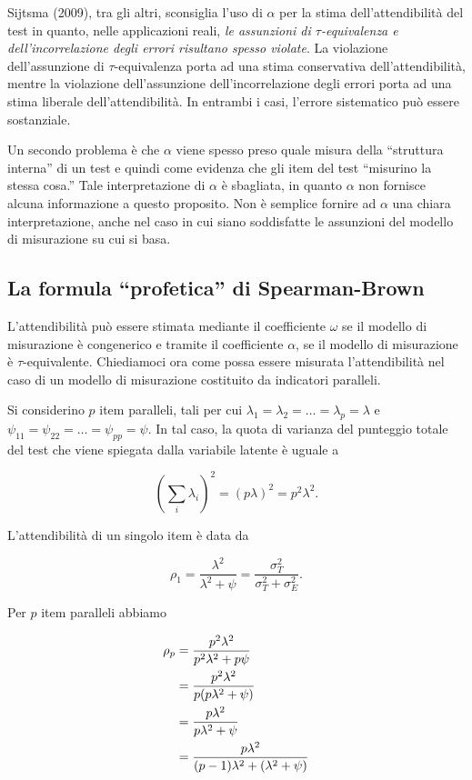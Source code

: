 \documentclass[
  11pt,
]{krantz}
\theoremstyle{definition}
\theoremstyle{definition}
\theoremstyle{definition}
\theoremstyle{definition}
\theoremstyle{remark}
\begin{document}
Sijtsma (2009), tra gli altri, sconsiglia l'uso di \(\alpha\) per la stima dell'attendibilità del test in quanto, nelle applicazioni reali, \emph{le assunzioni di \(\tau\)-equivalenza e dell'incorrelazione degli errori risultano spesso violate}. La violazione dell'assunzione di \(\tau\)-equivalenza porta ad una stima conservativa dell'attendibilità, mentre la violazione dell'assunzione dell'incorrelazione degli errori porta ad una stima liberale dell'attendibilità. In entrambi i casi, l'errore sistematico può essere sostanziale.

Un secondo problema è che \(\alpha\) viene spesso preso quale misura della ``struttura interna'' di un test e quindi come evidenza che gli item del test ``misurino la stessa cosa.'' Tale interpretazione di \(\alpha\) è sbagliata, in quanto \(\alpha\) non fornisce alcuna informazione a questo proposito. Non è semplice fornire ad \(\alpha\) una chiara interpretazione, anche nel caso in cui siano soddisfatte le assunzioni del modello di misurazione su cui si basa.

\hypertarget{la-formula-profetica-di-spearman-brown}{%
\subsection{La formula ``profetica'' di Spearman-Brown}\label{la-formula-profetica-di-spearman-brown}}

L'attendibilità può essere stimata mediante il coefficiente \(\omega\) se il modello di misurazione è congenerico e tramite il coefficiente \(\alpha\), se il modello di misurazione è \(\tau\)-equivalente. Chiediamoci ora come possa essere misurata l'attendibilità nel caso di un modello di misurazione costituito da indicatori paralleli.

Si considerino \(p\) item paralleli, tali per cui \(\lambda_1=\lambda_2=\dots=\lambda_p=\lambda\) e \(\psi_{11}=\psi_{22}=\dots=\psi_{pp}=\psi\). In tal caso, la quota di varianza del punteggio totale del test che viene spiegata dalla variabile latente è uguale a

\[
\left(\sum_i \lambda_i \right)^2 = (p \lambda)^2 = p^2 \lambda^2.
\]

L'attendibilità di un singolo item è data da

\[
\rho_1 = \frac{\lambda^2}{\lambda^2 + \psi} = \frac{\sigma_T^2}{\sigma_T^2+ \sigma_E^2}.
\]

Per \(p\) item paralleli abbiamo

\begin{equation}
\begin{aligned}
  \rho_p &= \frac{p^2 \lambda^2}{p^2 \lambda^2 + p \psi} \notag\\
         &= \frac{p^2 \lambda^2}{ p (p \lambda^2 + \psi)} \notag\\
         &= \frac{p \lambda^2}{ p \lambda^2 + \psi} \notag\\
         &= \frac{p \lambda^2}{(p-1) \lambda^2 + (\lambda^2 + \psi)} \notag
\end{aligned}
\end{equation}
\end{document}
